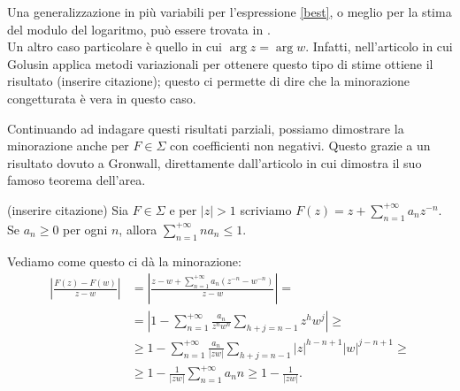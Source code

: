 Una generalizzazione in più variabili per l'espressione \eqref{best}, o meglio per la stima del modulo del logaritmo, può essere trovata in \cite[Chapter IV.2, Theorem 3]{Gol}. \\

Un altro caso particolare è quello in cui $\arg{z}=\arg{w}$. Infatti, nell'articolo in cui Golusin applica metodi variazionali per ottenere questo tipo di stime ottiene il risultato (inserire citazione); questo ci permette di dire che la minorazione congetturata è vera in questo caso.

Continuando ad indagare questi risultati parziali, possiamo dimostrare la minorazione anche per $F \in \Sigma$ con coefficienti non negativi. Questo grazie a un risultato dovuto a Gronwall, direttamente dall'articolo in cui dimostra il suo famoso teorema dell'area.
\begin{prop}
  (inserire citazione) Sia $F \in \Sigma$ e per $|z|>1$ scriviamo $F(z)=z+\displaystyle \sum_{n=1}^{+\infty} a_nz^{-n}$. Se $a_n \ge 0$ per ogni $n$, allora $\displaystyle \sum_{n=1}^{+\infty} na_n \le 1$.
\end{prop}
Vediamo come questo ci dà la minorazione:
\begin{align*}
  \left|\frac{F(z)-F(w)}{z-w}\right|&=\left|\frac{z-w+\sum_{n=1}^{+\infty}a_n(z^{-n}-w^{-n})}{z-w}\right|=\\
  &=\left|1-\sum_{n=1}^{+\infty} \frac{a_n}{z^nw^n}\sum_{h+j=n-1}z^hw^j\right| \ge \\
  &\ge 1-\sum_{n=1}^{+\infty} \frac{a_n}{|zw|}\sum_{h+j=n-1}|z|^{h-n+1}|w|^{j-n+1} \ge \\
  & \ge 1-\frac{1}{|zw|}\sum_{n=1}^{+\infty} a_nn \ge 1-\frac{1}{|zw|}.
\end{align*}

